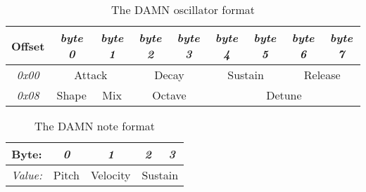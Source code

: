\documentclass[11pt]{article}
\begin{document}
\begin{table}[]
\centering
\caption{The DAMN oscillator format}
\label{my-label}
\begin{tabular}{|c|c|c|c|c|c|c|c|c|}
\hline
\textbf{Offset} & \textit{byte 0} & \textit{byte 1} & \textit{byte 2} & \textit{byte 3} & \textit{byte 4}  & \textit{byte 5} & \textit{byte 6}  & \textit{byte 7} \\ \hline
\textit{0x00}   & \multicolumn{2}{c|}{Attack} & \multicolumn{2}{c|}{Decay}  & \multicolumn{2}{c|}{Sustain} & \multicolumn{2}{c|}{Release} \\ \hline
\textit{0x08}   & Shape        & Mix          & \multicolumn{2}{c|}{Octave} & \multicolumn{4}{c|}{Detune}                                 \\ \hline
\end{tabular}
\end{table}

\begin{table}[]
\centering
\caption{The DAMN note format}
\label{my-label}
\begin{tabular}{|c|c|c|c|c|}
\hline
\textbf{Byte:} & \textit{0} & \textit{1} & \textit{2}  & \textit{3} \\ \hline
\textit{Value:}  & Pitch        & Velocity     & \multicolumn{2}{c|}{Sustain} \\ \hline
\end{tabular}
\end{table}
\end{document}

